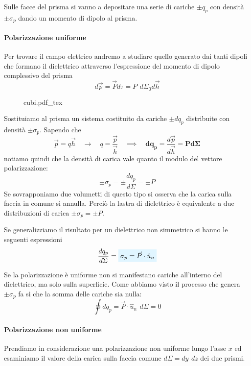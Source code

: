 \documentclass[x11names]{report}
\newcommand{\incfig}[1]{%
	{#1.pdf_tex}
}
\newcommand{\viola}[1]{%
	\colorbox{myblue}{$\displaystyle #1$}
}
\begin{document}
Sulle facce del prisma si vanno a depositare una serie di cariche \(\pm q_p\) con densità \(\pm \sigma_p\) dando un momento di dipolo al prisma.

\paragraph{Polarizzazione uniforme}
Per trovare il campo elettrico andremo a studiare quello generato dai tanti dipoli che formano il dielettrico attraverso l'espressione del momento di dipolo complessivo del prisma
\[
d\vec{p} = \vec{P}d\tau = P \,\ d\Sigma_0 d\vec{h}
\]

\begin{figure}[H]
	\centering
	\incfig{cubi}
\end{figure}

Sostituiamo al prisma un sistema costituito da cariche \(\pm dq_p\) distribuite con densità \(\pm\sigma_p\). Sapendo che 
\[
\vec{p} = q \vec{h} \quad \to \quad q = \frac{\vec{p}}{\vec{h}} \quad \implies \quad \boldsymbol{dq_p =} \frac{d\vec{p}}{d\vec{h}} \boldsymbol{= Pd\Sigma}
\]
notiamo quindi che la densità di carica vale quanto il modulo del vettore polarizzazione:
\[
\pm\sigma_p = \pm\frac{dq_p}{d\Sigma} =\pm P
\]
Se sovrapponiamo due volumetti di questo tipo si osserva che la carica sulla faccia in comune si annulla. Perciò la lastra di dielettrico è equivalente a due distribuzioni di carica \(\pm \sigma_p = \pm P\).

Se generalizziamo il risultato per un dielettrico non simmetrico si hanno le seguenti espressioni 
\begin{equation}
	\frac{dq_p}{d\Sigma} = \viola{\sigma_p = \vec{P} \cdot \hat{u}_n  }
\end{equation}



Se la polarizzazione è uniforme non si manifestano cariche all'interno del dielettrico, ma solo sulla superficie. Come abbiamo visto il processo che genera \(\pm \sigma_p\) fa sì che la somma delle cariche sia nulla:
\[
\oint dq_p =  \vec{P} \cdot \hat{u}_n \,\ d\Sigma = 0
\]

\paragraph{Polarizzazione non uniforme}
Prendiamo in considerazione una polarizzazione non uniforme lungo l'asse \(x\)  ed esaminiamo il valore della carica sulla faccia comune \(d\Sigma = dy \,\ dz \) dei due prismi.
\end{document}
